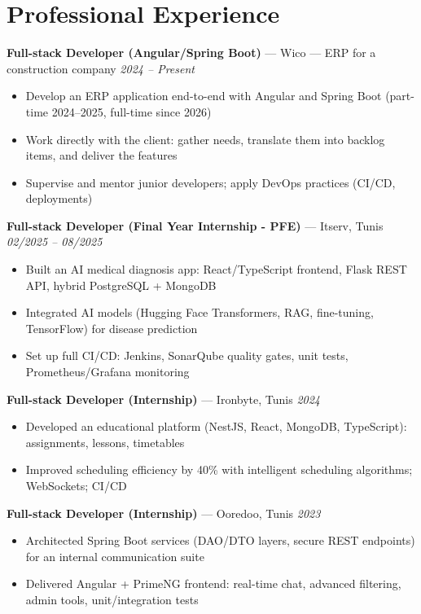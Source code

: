 \documentclass[10pt,a4paper]{article}
\newcommand{\entry}[3]{%
  \textbf{#1} --- #2 \hfill {\color{gray}\textit{#3}}\par}
\begin{document}
\section*{Professional Experience}
{\small

\entry{Full-stack Developer (Angular/Spring Boot)}{Wico --- ERP for a construction company}{2024 -- Present}
\begin{itemize}[leftmargin=12pt,itemsep=0pt,topsep=1pt,parsep=0pt]
  \item Develop an ERP application end-to-end with Angular and Spring Boot (part-time 2024--2025, full-time since 2026)
  \item Work directly with the client: gather needs, translate them into backlog items, and deliver the features
  \item Supervise and mentor junior developers; apply DevOps practices (CI/CD, deployments)
\end{itemize}

\vspace{3pt}
\entry{Full-stack Developer (Final Year Internship - PFE)}{Itserv, Tunis}{02/2025 -- 08/2025}
\begin{itemize}[leftmargin=12pt,itemsep=0pt,topsep=1pt,parsep=0pt]
  \item Built an AI medical diagnosis app: React/TypeScript frontend, Flask REST API, hybrid PostgreSQL + MongoDB
  \item Integrated AI models (Hugging Face Transformers, RAG, fine-tuning, TensorFlow) for disease prediction
  \item Set up full CI/CD: Jenkins, SonarQube quality gates, unit tests, Prometheus/Grafana monitoring
\end{itemize}

\vspace{3pt}
\entry{Full-stack Developer (Internship)}{Ironbyte, Tunis}{2024}
\begin{itemize}[leftmargin=12pt,itemsep=0pt,topsep=1pt,parsep=0pt]
  \item Developed an educational platform (NestJS, React, MongoDB, TypeScript): assignments, lessons, timetables
  \item Improved scheduling efficiency by 40\% with intelligent scheduling algorithms; WebSockets; CI/CD
\end{itemize}

\vspace{3pt}
\entry{Full-stack Developer (Internship)}{Ooredoo, Tunis}{2023}
\begin{itemize}[leftmargin=12pt,itemsep=0pt,topsep=1pt,parsep=0pt]
  \item Architected Spring Boot services (DAO/DTO layers, secure REST endpoints) for an internal communication suite
  \item Delivered Angular + PrimeNG frontend: real-time chat, advanced filtering, admin tools, unit/integration tests
\end{itemize}

}
\end{document}
